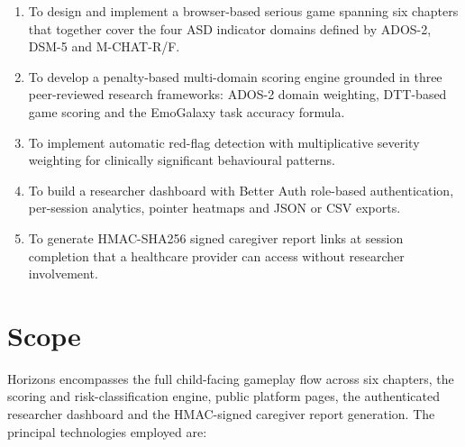 \documentclass[12pt,a4paper,oneside]{report}
\begin{document}
	\begin{enumerate}[leftmargin=0.5in, label=\arabic*.]
		\item To design and implement a browser-based serious game spanning six chapters that together cover the four ASD indicator domains defined by ADOS-2, DSM-5 and M-CHAT-R/F.
		\item To develop a penalty-based multi-domain scoring engine grounded in three peer-reviewed research frameworks: ADOS-2 domain weighting, DTT-based game scoring and the EmoGalaxy task accuracy formula.
		\item To implement automatic red-flag detection with multiplicative severity weighting for clinically significant behavioural patterns.
		\item To build a researcher dashboard with Better Auth role-based authentication, per-session analytics, pointer heatmaps and JSON or CSV exports.
		\item To generate HMAC-SHA256 signed caregiver report links at session completion that a healthcare provider can access without researcher involvement.
	\end{enumerate}
	
	\section{Scope}
	
	Horizons encompasses the full child-facing gameplay flow across six chapters, the scoring and risk-classification engine, public platform pages, the authenticated researcher dashboard and the HMAC-signed caregiver report generation. The principal technologies employed are:
	
\end{document}
